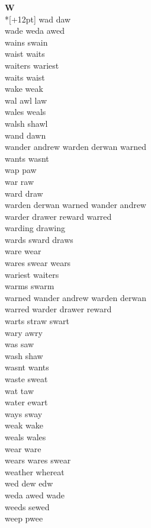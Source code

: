 \vspace{14pt}
\noindent\textbf{\Large W}\\*[+12pt]
wad daw\\
wade weda awed\\
wains swain\\
waist waits\\
waiters wariest\\
waits waist\\
wake weak\\
wal awl law\\
wales weals\\
walsh shawl\\
wand dawn\\
wander andrew warden derwan warned\\
wants wasnt\\
wap paw\\
war raw\\
ward draw\\
warden derwan warned wander andrew\\
warder drawer reward warred\\
warding drawing\\
wards sward draws\\
ware wear\\
wares swear wears\\
wariest waiters\\
warms swarm\\
warned wander andrew warden derwan\\
warred warder drawer reward\\
warts straw swart\\
wary awry\\
was saw\\
wash shaw\\
wasnt wants\\
waste sweat\\
wat taw\\
water ewart\\
ways sway\\
weak wake\\
weals wales\\
wear ware\\
wears wares swear\\
weather whereat\\
wed dew edw\\
weda awed wade\\
weeds sewed\\
weep pwee\\
